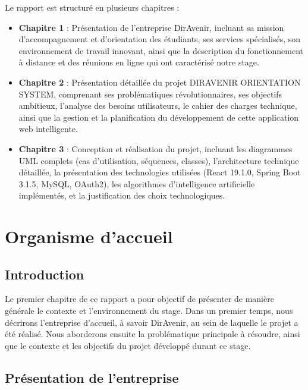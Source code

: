 \documentclass[12pt,a4paper]{report}
\begin{document}
Le rapport est structuré en plusieurs chapitres :

\begin{itemize}
    \item \textbf{Chapitre 1} : Présentation de l'entreprise DirAvenir, incluant sa mission d'accompagnement et d'orientation des étudiants, ses services spécialisés, son environnement de travail innovant, ainsi que la description du fonctionnement à distance et des réunions en ligne qui ont caractérisé notre stage.
    
    \item \textbf{Chapitre 2} : Présentation détaillée du projet DIRAVENIR ORIENTATION SYSTEM, comprenant ses problématiques révolutionnaires, ses objectifs ambitieux, l'analyse des besoins utilisateurs, le cahier des charges technique, ainsi que la gestion et la planification du développement de cette application web intelligente.
    
    \item \textbf{Chapitre 3} : Conception et réalisation du projet, incluant les diagrammes UML complets (cas d'utilisation, séquences, classes), l'architecture technique détaillée, la présentation des technologies utilisées (React 19.1.0, Spring Boot 3.1.5, MySQL, OAuth2), les algorithmes d'intelligence artificielle implémentés, et la justification des choix technologiques.
\end{itemize}

\chapter{Organisme d'accueil}

\section{Introduction}

Le premier chapitre de ce rapport a pour objectif de présenter de manière générale le contexte et l'environnement du stage. Dans un premier temps, nous décrirons l'entreprise d'accueil, à savoir DirAvenir, au sein de laquelle le projet a été réalisé. Nous aborderons ensuite la problématique principale à résoudre, ainsi que le contexte et les objectifs du projet développé durant ce stage.

\section{Présentation de l'entreprise}
\end{document}
